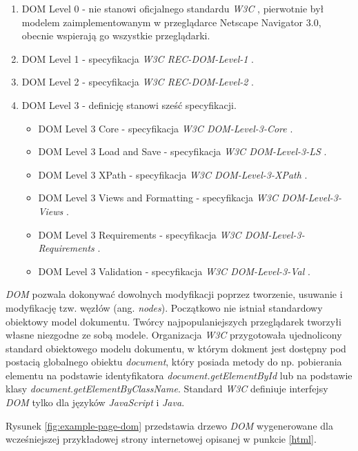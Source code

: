 \documentclass[polish, twoside, 12pt]{mwart}
\begin{document}
\begin{enumerate}
  \item DOM Level 0 - nie stanowi oficjalnego standardu \emph{W3C} \cite{w3c}, pierwotnie był modelem zaimplementowanym w przeglądarce Netscape Navigator 3.0, obecnie wspierają go wszystkie przeglądarki.
  \item DOM Level 1 - specyfikacja \emph{W3C REC-DOM-Level-1} \cite{w3c-rec-dom-level-1}.
  \item DOM Level 2 - specyfikacja \emph{W3C REC-DOM-Level-2} \cite{w3c-rec-dom-level-2}.
  \item DOM Level 3 - definicję stanowi sześć specyfikacji.
  \begin{itemize}
    \item DOM Level 3 Core - specyfikacja \emph{W3C DOM-Level-3-Core} \cite{w3c-rec-dom-level-3-core}.
    \item DOM Level 3 Load and Save - specyfikacja \emph{W3C DOM-Level-3-LS} \cite{w3c-rec-dom-level-3-ls}.
    \item DOM Level 3 XPath - specyfikacja \emph{W3C DOM-Level-3-XPath} \cite{w3c-rec-dom-level-3-xpath}.
    \item DOM Level 3 Views and Formatting - specyfikacja \emph{W3C DOM-Level-3-Views} \cite{w3c-rec-dom-level-3-views}.
    \item DOM Level 3 Requirements - specyfikacja \emph{W3C DOM-Level-3-Requirements} \cite{w3c-rec-dom-level-3-requirements}.
    \item DOM Level 3 Validation - specyfikacja \emph{W3C DOM-Level-3-Val} \cite{w3c-rec-dom-level-3-val}.
  \end{itemize}
\end{enumerate}

\emph{DOM} pozwala dokonywać dowolnych modyfikacji poprzez tworzenie, usuwanie i modyfikację tzw. węzłów (ang. \emph{nodes}). Początkowo nie istniał standardowy obiektowy model dokumentu. Twórcy najpopulaniejszych przeglądarek tworzyłi własne niezgodne ze sobą modele. Organizacja \emph{W3C} \cite{w3c} przygotowała ujednolicony standard obiektowego modelu dokumentu, w którym dokment jest dostępny pod postacią globalnego obiektu \emph{document}, który posiada metody do np. pobierania elementu na podstawie identyfikatora \emph{document.getElementById} lub na podstawie klasy \emph{document.getElementByClassName}. Standard \emph{W3C} definiuje interfejsy \emph{DOM} tylko dla języków \emph{JavaScript} i \emph{Java}.

Rysunek \ref{fig:example-page-dom} przedstawia drzewo \emph{DOM} wygenerowane dla wcześniejszej przykładowej strony internetowej opisanej w punkcie \ref{html}.
\end{document}
